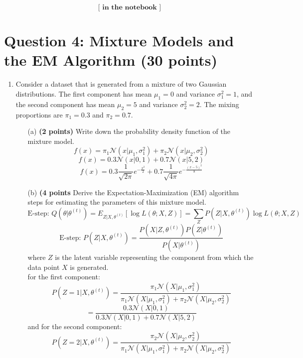 \documentclass{article}
\begin{document}
\[
\textbf{[ in the notebook ]}
\]




\section*{Question 4: Mixture Models and the EM Algorithm (30 points)}

\begin{enumerate}
    \item Consider a dataset that is generated from a mixture of two Gaussian distributions. The first component has mean \(\mu_1 = 0\) and variance \(\sigma_1^2 = 1\), and the second component has mean \(\mu_2 = 5\) and variance \(\sigma_2^2 = 2\). The mixing proportions are \(\pi_1 = 0.3\) and \(\pi_2 = 0.7\).
    \begin{enumerate}
        \item[(a)] \textbf{(2 points)} Write down the probability density function of the mixture model.
        \[
        f(x) = \pi_1 \mathcal{N}(x | \mu_1, \sigma_1^2) + \pi_2 \mathcal{N}(x | \mu_2, \sigma_2^2)
        \]
        \[
        f(x) = 0.3 \mathcal{N}(x | 0, 1) + 0.7 \mathcal{N}(x | 5, 2)
        \]
        \[
        f(x) = 0.3 \frac{1}{\sqrt{2\pi}} e^{-\frac{x^2}{2}} + 0.7 \frac{1}{\sqrt{4\pi}} e^{-\frac{(x-5)^2}{8}}
        \]
        \item[(b)] \textbf{(4 points} Derive the Expectation-Maximization (EM) algorithm steps for estimating the parameters of this mixture model.
        \[
        \text{E-step: } Q(\theta | \theta^{(t)}) = E_{Z|X, \theta^{(t)}}[\log L(\theta; X, Z)] = \sum_{Z} P(Z | X, \theta^{(t)}) \log L(\theta; X, Z)
        \]
        \[
        \text{E-step: } P(Z | X, \theta^{(t)}) = \frac{P(X | Z, \theta^{(t)}) P(Z | \theta^{(t)})}{P(X | \theta^{(t)})}
        \]
        where \( Z \) is the latent variable representing the component from which the data point \( X \) is generated.
        \\ for the first component:
        \[
        P(Z = 1 | X, \theta^{(t)}) = \frac{\pi_1 \mathcal{N}(X | \mu_1, \sigma_1^2)}{\pi_1 \mathcal{N}(X | \mu_1, \sigma_1^2) + \pi_2 \mathcal{N}(X | \mu_2, \sigma_2^2)}
        \]
        \[
        = \frac{0.3 \mathcal{N}(X | 0, 1)}{0.3 \mathcal{N}(X | 0, 1) + 0.7 \mathcal{N}(X | 5, 2)}
        \]
        and for the second component:
        \[
        P(Z = 2 | X, \theta^{(t)}) = \frac{\pi_2 \mathcal{N}(X | \mu_2, \sigma_2^2)}{\pi_1 \mathcal{N}(X | \mu_1, \sigma_1^2) + \pi_2 \mathcal{N}(X | \mu_2, \sigma_2^2)}
        \]
        \[
\]
\end{enumerate}
\end{enumerate}
\end{document}
